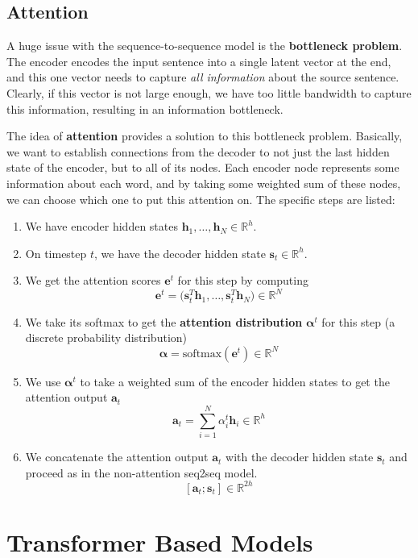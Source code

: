 \documentclass{article}
\begin{document}
  \subsection{Attention}

    A huge issue with the sequence-to-sequence model is the \textbf{bottleneck problem}. The encoder encodes the input sentence into a single latent vector at the end, and this one vector needs to capture \textit{all information} about the source sentence. Clearly, if this vector is not large enough, we have too little bandwidth to capture this information, resulting in an information bottleneck. 

    The idea of \textbf{attention} provides a solution to this bottleneck problem. Basically, we want to establish connections from the decoder to not just the last hidden state of the encoder, but to all of its nodes. Each encoder node represents some information about each word, and by taking some weighted sum of these nodes, we can choose which one to put this attention on. The specific steps are listed: 
    \begin{enumerate}
        \item We have encoder hidden states $\mathbf{h}_1, \ldots, \mathbf{h}_N \in \mathbb{R}^h$. 
        \item On timestep $t$, we have the decoder hidden state $\mathbf{s}_t \in \mathbb{R}^h$.  
        \item We get the attention scores $\mathbf{e}^t$ for this step by computing 
        \[\mathbf{e}^t = \big( \mathbf{s}_t^T \mathbf{h}_1 , \ldots, \mathbf{s}_t^T \mathbf{h}_N \big) \in \mathbb{R}^N\]
        \item We take its softmax to get the \textbf{attention distribution} $\boldsymbol{\alpha}^t$ for this step (a discrete probability distribution) 
        \[\boldsymbol{\alpha} = \mathrm{softmax} (\mathbf{e}^t) \in \mathbb{R}^N\]

        \item We use $\boldsymbol{\alpha}^t$ to take a weighted sum of the encoder hidden states to get the attention output $\mathbf{a}_t$ 
        \[\mathbf{a}_t = \sum_{i=1}^N \alpha_i^t \mathbf{h}_i \in \mathbb{R}^h\]

        \item We concatenate the attention output $\mathbf{a}_t$ with the decoder hidden state $\mathbf{s}_t$ and proceed as in the non-attention seq2seq model. 
        \[[\mathbf{a}_t ; \mathbf{s}_t ] \in \mathbb{R}^{2h}\]
    \end{enumerate}

\section{Transformer Based Models}
\end{document}
